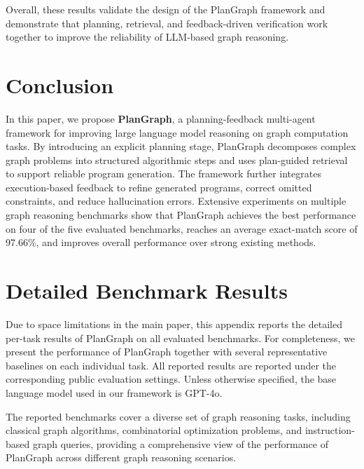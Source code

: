 \documentclass[sigconf,review,anonymous]{acmart}
\begin{document}
Overall, these results validate the design of the
PlanGraph framework and demonstrate that planning,
retrieval, and feedback-driven verification work
together to improve the reliability of LLM-based
graph reasoning.

\section{Conclusion}

In this paper, we propose \textbf{PlanGraph}, a planning-feedback multi-agent framework for improving large language model reasoning on graph computation tasks. By introducing an explicit planning stage, PlanGraph decomposes complex graph problems into structured algorithmic steps and uses plan-guided retrieval to support reliable program generation. The framework further integrates execution-based feedback to refine generated programs, correct omitted constraints, and reduce hallucination errors. Extensive experiments on multiple graph reasoning benchmarks show that PlanGraph achieves the best performance on four of the five evaluated benchmarks, reaches an average exact-match score of 97.66\%, and improves overall performance over strong existing methods.

\nocite{*}




\appendix

\section{Detailed Benchmark Results}

Due to space limitations in the main paper, this appendix
reports the detailed per-task results of PlanGraph on all
evaluated benchmarks. For completeness, we present the
performance of PlanGraph together with several representative
baselines on each individual task. All reported results are
reported under the corresponding public evaluation settings. Unless otherwise
specified, the base language model used in our framework is
GPT-4o.

The reported benchmarks cover a diverse set of graph reasoning
tasks, including classical graph algorithms, combinatorial
optimization problems, and instruction-based graph queries,
providing a comprehensive view of the performance of PlanGraph
across different graph reasoning scenarios.
\end{document}
